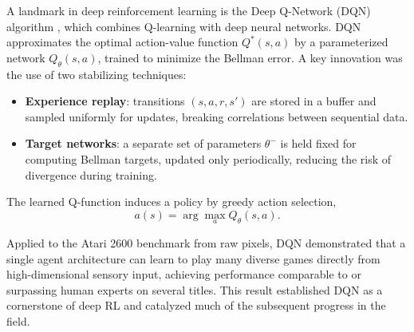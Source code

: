 A landmark in deep reinforcement learning is the Deep Q-Network (DQN) algorithm
\cite{mnih2015human}, which combines Q-learning with deep neural networks.
DQN approximates the optimal action-value function $Q^*(s,a)$ by a parameterized
network $Q_\theta(s,a)$, trained to minimize the Bellman error. A key innovation
was the use of two stabilizing techniques:

\begin{itemize}
    \item \textbf{Experience replay}: transitions $(s,a,r,s')$ are stored in a buffer
    and sampled uniformly for updates, breaking correlations between sequential data.
    \item \textbf{Target networks}: a separate set of parameters $\theta^{-}$ is held
    fixed for computing Bellman targets, updated only periodically, reducing the risk
    of divergence during training.
\end{itemize}

The learned Q-function induces a policy by greedy action selection,
\[
a(s) = \arg\max_a Q_\theta(s,a).
\]

Applied to the Atari 2600 benchmark from raw pixels, DQN demonstrated that a
single agent architecture can learn to play many diverse games directly from
high-dimensional sensory input, achieving performance comparable to or
surpassing human experts on several titles. This result established DQN as a
cornerstone of deep RL and catalyzed much of the subsequent progress in the
field.



